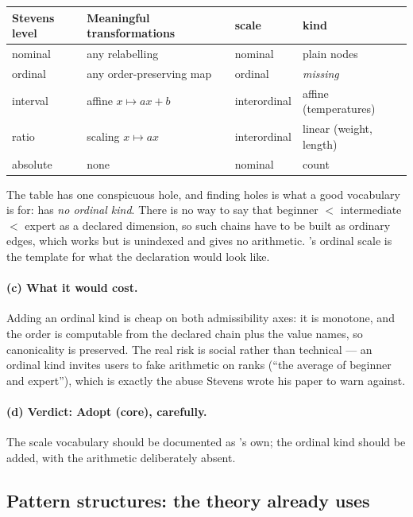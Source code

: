 \begin{center}\small
\begin{tabularx}{\textwidth}{@{}p{2.3cm} p{4.3cm} p{3.1cm} X@{}}
\toprule
\textbf{Stevens level} & \textbf{Meaningful transformations} &
\textbf{\fca{} scale} & \textbf{\odag{} kind}\\
\midrule
nominal  & any relabelling            & nominal      & plain nodes\\
ordinal  & any order-preserving map   & ordinal      & \emph{missing}\\
interval & affine $x \mapsto ax + b$  & interordinal & affine (temperatures)\\
ratio    & scaling $x \mapsto ax$     & interordinal & linear (weight, length)\\
absolute & none                       & nominal      & count\\
\bottomrule
\end{tabularx}
\end{center}

The table has one conspicuous hole, and finding holes is what a good
vocabulary is for: \odag{} has \emph{no ordinal kind}. There is no way to say
that \textsf{beginner} $<$ \textsf{intermediate} $<$ \textsf{expert} as a
declared dimension, so such chains have to be built as ordinary edges, which
works but is unindexed and gives no arithmetic. \fca{}'s ordinal scale is the
template for what the declaration would look like.

\paragraph{(c) What it would cost.} Adding an ordinal kind is cheap on both
admissibility axes: it is monotone, and the order is computable from the
declared chain plus the value names, so canonicality is preserved. The real
risk is social rather than technical --- an ordinal kind invites users to fake
arithmetic on ranks (``the average of beginner and expert''), which is exactly
the abuse Stevens wrote his paper to warn against.

\paragraph{(d) Verdict: \textbf{Adopt (core)}, carefully.} The scale
vocabulary should be documented as \odag{}'s own; the ordinal kind should be
added, with the arithmetic deliberately absent.

\subsection{Pattern structures: the theory \odag{} already uses}
\label{sec:learn-patterns}

